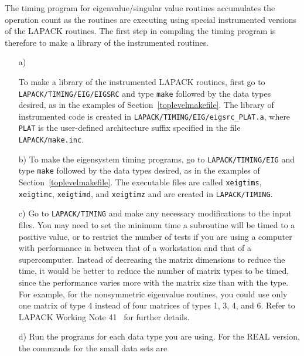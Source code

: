 \documentclass[11pt]{report}
\begin{document}
The timing program for eigenvalue/singular value routines accumulates
the operation count as the routines are executing using special
instrumented versions of the LAPACK routines.  The first step in
compiling the timing program is therefore to make a library of the
instrumented routines.

\begin{itemize}
\item[a)]
\begin{sloppypar}
To make a library of the instrumented LAPACK routines, first
go to \texttt{LAPACK/TIMING/EIG/EIGSRC} and type \texttt{make} followed
by the data types desired, as in the examples of Section~\ref{toplevelmakefile}. 
The library of instrumented code is created in
\texttt{LAPACK/TIMING/EIG/eigsrc\_PLAT.a},
where \texttt{PLAT} is the user-defined architecture suffix specified in the
file \texttt{LAPACK/make.inc}.
\end{sloppypar}

\item[b)]
To make the eigensystem timing programs, 
go to \texttt{LAPACK/TIMING/EIG} and
type \texttt{make} followed by the data types desired, as in the examples
of Section~\ref{toplevelmakefile}.  The executable files are called
\texttt{xeigtims}, \texttt{xeigtimc}, \texttt{xeigtimd}, and \texttt{xeigtimz}
and are created in \texttt{LAPACK/TIMING}.

\item[c)]
Go to \texttt{LAPACK/TIMING} and
make any necessary modifications to the input files.
You may need to set the minimum time a subroutine will
be timed to a positive value, or to restrict the number of tests
if you are using a computer with performance in between that of a
workstation and that of a supercomputer.
Instead of decreasing the matrix dimensions to reduce the time,
it would be better to reduce the number of matrix types to be timed,
since the performance varies more with the matrix size than with the
type.  For example, for the nonsymmetric eigenvalue routines,
you could use only one matrix of type 4 instead of four matrices of
types 1, 3, 4, and 6.
Refer to LAPACK Working Note 41~\cite{WN41} for further details.

\item[d)]
Run the programs for each data type you are using. 
For the REAL version, the commands for the small data sets are


\end{itemize}
\end{document}
